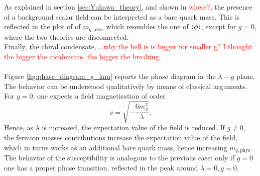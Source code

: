 As explained in section \ref{sec:Yukawa_theory}, and shown in \textcolor{red}{where?}, the presence of a background scalar field can be interpreted as a bare quark mass. This is reflected in the plot of of $m_{q, \text{phys}}$ which resembles the one of $\left\langle \phi \right\rangle$, except for $g=0$, where the two theories are disconnected. \\
Finally, the chiral condensate, \dots \textcolor{red}{why the hell is is bigger for smaller g? I thought the bigger the condensate, the bigger the breaking.} \\~\\
Figure \ref{fig:phase_diagram_g_lam} reports the phase diagram in the $\lambda - g$ plane. The behavior can be understood qualitatively by means of classical arguments. 
For $g=0$, one expects a field magnetisation of order 
\begin{equation*}
    v = \sqrt{-\frac{6 m_\phi^2}{\lambda}}.
\end{equation*}
Hence, as $\lambda$ is increased, the expectation value of the field is reduced.
If $g \neq 0$, the fermion masses contributions increase the expectation value of the field, which in turns works as an additional bare quark mass, hence increasing $m_{q, \text{phys}}$. The behavior of the susceptibility is analogous to the previous case: only if $g=0$ one has a proper phase transition, reflected in the peak around $\lambda = 0, g = 0$.
